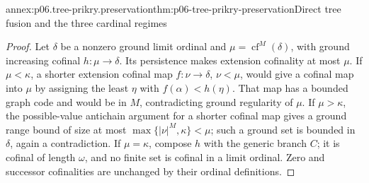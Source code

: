 \begin{annexitem}{annex:p06.tree-prikry.preservation}{thm:p06-tree-prikry-preservation}{Direct tree fusion and the three cardinal regimes}
\begin{proof}
Let \(\delta\) be a nonzero ground limit ordinal and
\(\mu=\operatorname{cf}^M(\delta)\), with ground increasing cofinal
\(h:\mu\to\delta\). Its persistence makes extension cofinality at
most \(\mu\). If \(\mu<\kappa\), a shorter extension cofinal map
\(f:\nu\to\delta\), \(\nu<\mu\), would give a cofinal map into
\(\mu\) by assigning the least \(\eta\) with \(f(\alpha)<h(\eta)\).
That map has a bounded graph code and would be in \(M\), contradicting
ground regularity of \(\mu\). If \(\mu>\kappa\), the possible-value
antichain argument for a shorter cofinal map gives a ground range bound
of size at most \(\max\{|\nu|^M,\kappa\}<\mu\); such a ground set
is bounded in \(\delta\), again a contradiction. If \(\mu=\kappa\),
compose \(h\) with the generic branch \(C\); it is cofinal of length
\(\omega\), and no finite set is cofinal in a limit ordinal. Zero and
successor cofinalities are unchanged by their ordinal definitions.
\end{proof}
\end{annexitem}

